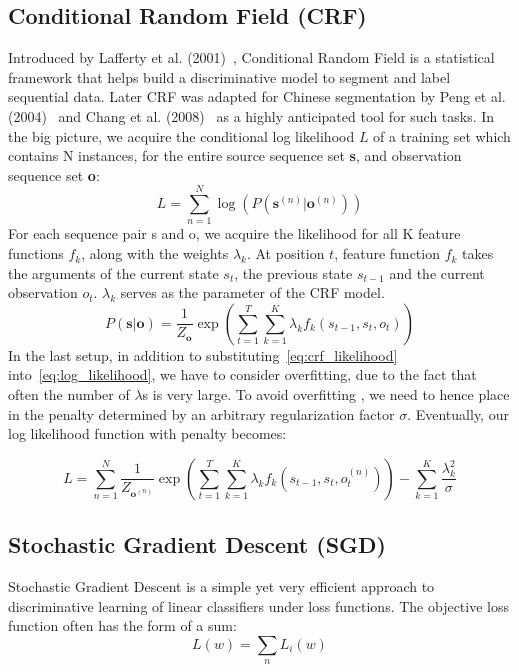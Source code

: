 \documentclass[UTF8,11pt]{article}
\begin{document}
\subsection{Conditional Random Field (CRF)}
\noindent Introduced by Lafferty et al. (2001)~\cite{crf}, Conditional Random Field is a statistical framework that helps build a discriminative model to segment and label sequential data. Later CRF was adapted for Chinese segmentation by Peng et al. (2004)~\cite{biblo0} and Chang et al. (2008)~\cite{biblo2} as a highly anticipated tool for such tasks. \newline
\indent In the big picture, we acquire the conditional log likelihood $L$ of a training set which contains N instances, for the entire source sequence set \textbf{s}, and observation sequence set \textbf{o}:
\begin{equation} \label{eq:log_likelihood}
    L = \sum_{n=1}^N \log(P( \mathbf{s}^{(n)} | \mathbf{o}^{(n)} ))
\end{equation}
\indent For each sequence pair s and o, we acquire the likelihood for all K feature functions $f_k$, along with the weights $\lambda_k$. At position $t$, feature function $f_k$ takes the arguments of the current state $s_t$, the previous state $s_{t-1}$ and the current observation $o_t$. $\lambda_k$ serves as the parameter of the CRF model.
\begin{equation} \label{eq:crf_likelihood}
    P(\mathbf{s}|\mathbf{o}) = \frac{1}{Z_{\mathbf{o}}} \exp \left( \sum_{t=1}^{T} \sum_{k=1}^K \lambda_k f_k(s_{t-1}, s_t, o_t) \right)
\end{equation}
\indent In the last setup, in addition to substituting~\ref{eq:crf_likelihood} into~\ref{eq:log_likelihood}, we have to consider overfitting, due to the fact that often the number of $\lambda$s is very large. To avoid overfitting , we need to hence place in the penalty determined by an arbitrary regularization factor $\sigma$. Eventually, our log likelihood function with penalty becomes:

\begin{equation} \label{eq:crf_log}
    L = \sum_{n=1}^{N} \frac{1}{Z_{\mathbf{o}^{(n)}}} \exp \left( \sum_{t=1}^{T} \sum_{k=1}^K \lambda_k f_k (s_{t-1}, s_t, o^{(n)}_t)\right) - \sum_{k=1}^K \frac{\lambda_k^2}{\sigma}
\end{equation}
\subsection{Stochastic Gradient Descent (SGD)}
\noindent Stochastic Gradient Descent is a simple yet very efficient approach to discriminative learning of linear classifiers under loss functions. The objective loss function often has the form of a sum:
\begin{equation}
    L(w) = \sum_{n} L_i (w)
\end{equation} 
\end{document}
